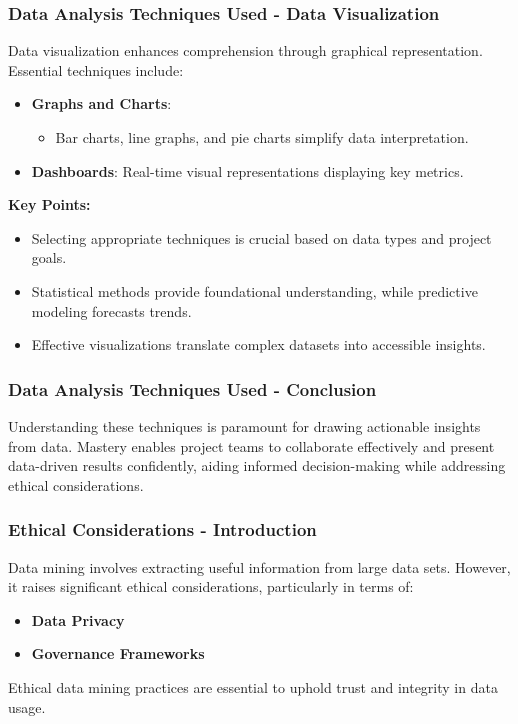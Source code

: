 \documentclass[aspectratio=169]{beamer}
\begin{document}
\begin{frame}[fragile]
    \frametitle{Data Analysis Techniques Used - Data Visualization}
    Data visualization enhances comprehension through graphical representation. Essential techniques include:
    
    \begin{itemize}
        \item \textbf{Graphs and Charts}: 
        \begin{itemize}
            \item Bar charts, line graphs, and pie charts simplify data interpretation.
        \end{itemize}
        
        \item \textbf{Dashboards}: 
        Real-time visual representations displaying key metrics.
    \end{itemize}
    
    \textbf{Key Points:}
    \begin{itemize}
        \item Selecting appropriate techniques is crucial based on data types and project goals.
        \item Statistical methods provide foundational understanding, while predictive modeling forecasts trends.
        \item Effective visualizations translate complex datasets into accessible insights.
    \end{itemize}
\end{frame}

\begin{frame}[fragile]
    \frametitle{Data Analysis Techniques Used - Conclusion}
    Understanding these techniques is paramount for drawing actionable insights from data. Mastery enables project teams to collaborate effectively and present data-driven results confidently, aiding informed decision-making while addressing ethical considerations.
\end{frame}

\begin{frame}[fragile]
    \frametitle{Ethical Considerations - Introduction}
    Data mining involves extracting useful information from large data sets. However, it raises significant ethical considerations, particularly in terms of:
    \begin{itemize}
        \item \textbf{Data Privacy}
        \item \textbf{Governance Frameworks}
    \end{itemize}
    Ethical data mining practices are essential to uphold trust and integrity in data usage.
\end{frame}
\end{document}
